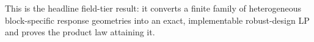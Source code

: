 This is the headline field-tier result: it converts a finite family of heterogeneous block-specific response geometries into an exact, implementable robust-design LP and proves the product law attaining it.